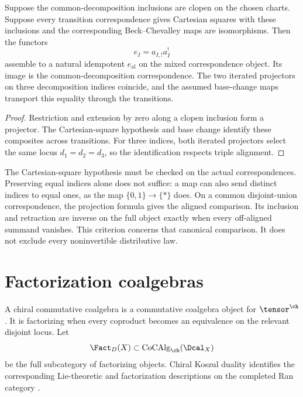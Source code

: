 \begin{theorem}
Suppose the common-decomposition inclusions are clopen on the chosen charts.
Suppose every transition correspondence gives Cartesian squares with these
inclusions and the corresponding Beck--Chevalley maps are isomorphisms.
Then the functors
\[
 e_I=a_{I,!}a_I^!
\]
assemble to a natural idempotent $e_{\mathrm{al}}$ on the mixed correspondence object. Its image is the common-decomposition correspondence. The two iterated projectors on three decomposition indices coincide, and the assumed base-change maps transport this equality through the transitions.
\end{theorem}
\begin{proof}
Restriction and extension by zero along a clopen inclusion form a projector.
The Cartesian-square hypothesis and base change identify these composites
across transitions. For three indices, both iterated projectors select the
same locus $d_1=d_2=d_3$, so the identification respects triple alignment.
\end{proof}

The Cartesian-square hypothesis must be checked on the actual correspondences.
Preserving equal indices alone does not suffice: a map can also send distinct
indices to equal ones, as the map $\{0,1\}\to\{*\}$ does.
On a common disjoint-union correspondence, the projection formula gives the
aligned comparison. Its inclusion and retraction are inverse on the full
object exactly when every off-aligned summand vanishes.
This criterion concerns that canonical comparison. It does not exclude every
noninvertible distributive law.

\section{Factorization coalgebras}
A chiral commutative coalgebra is a commutative coalgebra object for $\tensor^{\ch}$. It is factorizing when every coproduct becomes an equivalence on the relevant disjoint locus. Let
\[
 \Fact_D(X)\subset \operatorname{CoCAlg}_{\ch}(\Dcal_X)
\]
be the full subcategory of factorizing objects. Chiral Koszul duality identifies the corresponding Lie-theoretic and factorization descriptions on the completed Ran category \cite{FG12,Heuts}.

